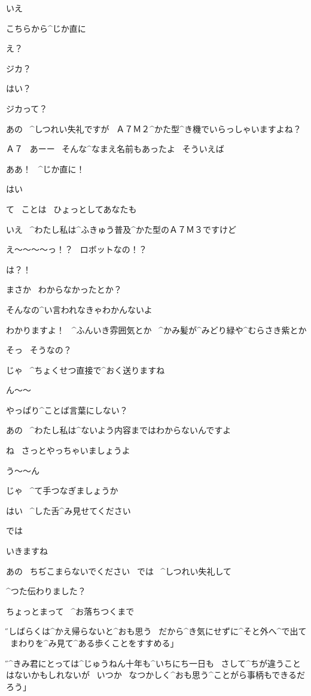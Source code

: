 \K いえ

\K こちらから^{じか}{直}に

\A え？

\A ジカ？

\K はい？

\A ジカって？

\page
\K あの
\ ^{しつれい}{失礼}ですが
\ Ａ７Ｍ２^{かた}{型}^{き}{機}でいらっしゃいますよね？

\A Ａ７
\ あーー
\ そんな^{なまえ}{名前}もあったよ
\ そういえば

\A ああ！
\ ^{じか}{直}に！

\K はい

\A て
\ ことは
\ ひょっとしてあなたも

\K いえ
\ ^{わたし}{私}は^{ふきゅう}{普及}^{かた}{型}のＡ７Ｍ３ですけど

\page
\A え〜〜〜〜っ！？
\ ロボットなの！？

\K は？！

\K まさか
\ わからなかったとか？

\A そんなの^{い}{言}われなきゃわかんないよ

\K わかりますよ！
\ ^{ふんいき}{雰囲気}とか
\ ^{かみ}{髪}が^{みどり}{緑}や^{むらさき}{紫}とか

\A そっ
\ そうなの？

\page
\K じゃ
\ ^{ちょくせつ}{直接}で^{おく}{送}りますね

\A ん〜〜

\A やっぱり^{ことば}{言葉}にしない？

\K あの
\ ^{わたし}{私}は^{ないよう}{内容}まではわからないんですよ

\K ね
\ さっとやっちゃいましょうよ

\A う〜〜ん

\page
\K じゃ
\ ^{て}{手}つなぎましょうか

\K はい
\ ^{した}{舌}^{み}{見}せてください

\K では

\K いきますね

\K あの
\ ちぢこまらないでください
\ では
\ ^{しつれい}{失礼}して

\page
\K ^{つた}{伝}わりました？

\A ちょっとまって
\ ^{お}{落}ちつくまで

\page
\H 「しばらくは^{かえ}{帰}らないと^{おも}{思}う
\ だから^{き}{気}にせずに^{そと}{外}へ^{で}{出}て
\ まわりを^{み}{見}て^{ある}{歩}くことをすすめる」

\H 「^{きみ}{君}にとっては^{じゅうねん}{十年}も^{いちにち}{一日}も
\ さして^{ちが}{違}うことはないかもしれないが
\ いつか
\ なつかしく^{おも}{思}う^{ことがら}{事柄}もできるだろう」

